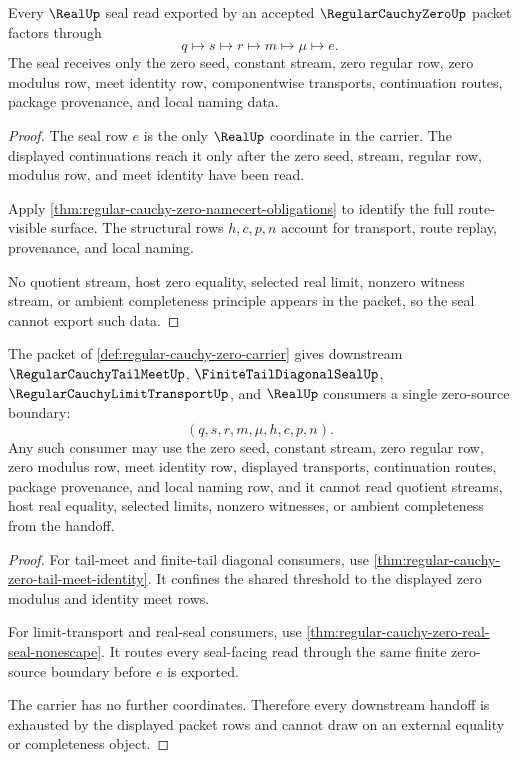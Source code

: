 \begin{theorem}
\label{thm:regular-cauchy-zero-real-seal-nonescape}
Every $\RealUp$ seal read exported by an accepted $\RegularCauchyZeroUp$ packet factors through
$$
q \longmapsto s \longmapsto r \longmapsto m \longmapsto \mu \longmapsto e.
$$
The seal receives only the zero seed, constant stream, zero regular row, zero modulus row, meet identity row, componentwise transports, continuation routes, package provenance, and local naming data.
\end{theorem}
\begin{proof}
The seal row $e$ is the only $\RealUp$ coordinate in the carrier. The displayed continuations reach it only after the zero seed, stream, regular row, modulus row, and meet identity have been read.

Apply \autoref{thm:regular-cauchy-zero-namecert-obligations} to identify the full route-visible surface. The structural rows $h,c,p,n$ account for transport, route replay, provenance, and local naming.

No quotient stream, host zero equality, selected real limit, nonzero witness stream, or ambient completeness principle appears in the packet, so the seal cannot export such data.
\end{proof}

\begin{theorem}
\label{thm:regular-cauchy-zero-downstream-handoff}
The packet of \autoref{def:regular-cauchy-zero-carrier} gives downstream $\RegularCauchyTailMeetUp$, $\FiniteTailDiagonalSealUp$, $\RegularCauchyLimitTransportUp$, and $\RealUp$ consumers a single zero-source boundary:
$$
(q,s,r,m,\mu,h,c,p,n).
$$
Any such consumer may use the zero seed, constant stream, zero regular row, zero modulus row, meet identity row, displayed transports, continuation routes, package provenance, and local naming row, and it cannot read quotient streams, host real equality, selected limits, nonzero witnesses, or ambient completeness from the handoff.
\end{theorem}
\begin{proof}
For tail-meet and finite-tail diagonal consumers, use \autoref{thm:regular-cauchy-zero-tail-meet-identity}. It confines the shared threshold to the displayed zero modulus and identity meet rows.

For limit-transport and real-seal consumers, use \autoref{thm:regular-cauchy-zero-real-seal-nonescape}. It routes every seal-facing read through the same finite zero-source boundary before $e$ is exported.

The carrier has no further coordinates. Therefore every downstream handoff is exhausted by the displayed packet rows and cannot draw on an external equality or completeness object.
\end{proof}

